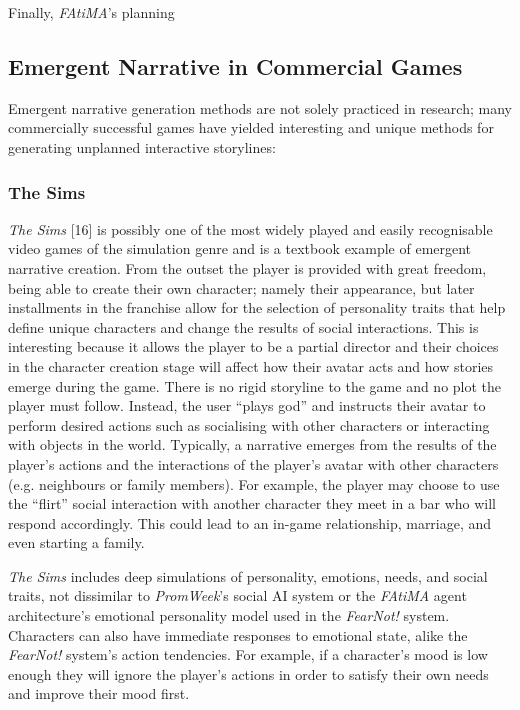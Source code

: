 \documentclass{sig-alternate-05-2015}
\begin{document}
Finally, \textit{FAtiMA}'s planning

\subsection{Emergent Narrative in Commercial Games}
Emergent narrative generation methods are not solely practiced in research; many commercially successful games have yielded interesting and unique methods for generating unplanned interactive storylines:

\subsubsection{The Sims}
\textit{The Sims} [16] is possibly one of the most widely played and easily recognisable video games of the simulation genre and is a textbook example of emergent narrative creation. 
From the outset the player is provided with great freedom, being able to create their own character; namely their appearance, but later installments in the franchise allow for the selection of personality traits that help define unique characters and change the results of social interactions. This is interesting because it allows the player to be a partial director and their choices in the character creation stage will affect how their avatar acts and how stories emerge during the game. There is no rigid storyline to the game and no plot the player must follow. Instead, the user ``plays god'' and instructs their avatar to perform desired actions such as socialising with other characters or interacting with objects in the world. Typically, a narrative emerges from the results of the player's actions and the interactions of the player's avatar with other characters (e.g. neighbours or family members). For example, the player may choose to use the ``flirt'' social interaction with another character they meet in a bar who will respond accordingly. This could lead to an in-game relationship, marriage, and even starting a family.

\textit{The Sims} includes deep simulations of personality, emotions, needs, and social traits, not dissimilar to \textit{PromWeek}'s social AI system or the \textit{FAtiMA} agent architecture's emotional personality model used in the \textit{FearNot!} system. Characters can also have immediate responses to emotional state, alike the \textit{FearNot!} system's action tendencies. For example, if a character's mood is low enough they will ignore the player's actions in order to satisfy their own needs and improve their mood first.
\end{document}
